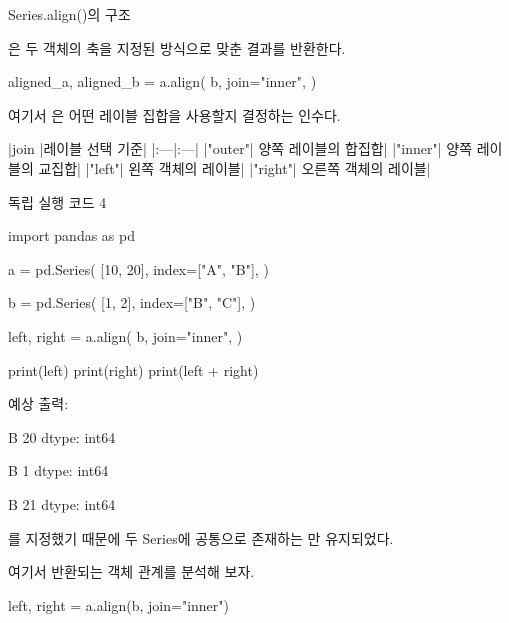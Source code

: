 \begin{dhknote}
\begin{dhksmry}[centered]
Series.align()의 구조
\end{dhksmry}
\end{dhknote}

은 두 객체의 축을 지정된 방식으로 맞춘 결과를 반환한다.

\begin{dhkcode}
aligned_a, aligned_b = a.align(
    b,
    join="inner",
)
\end{dhkcode}

여기서 은 어떤 레이블 집합을 사용할지 결정하는 인수다.

\begin{dhktable}
|join	|레이블 선택 기준|
|:---|:---|
|"outer"|	양쪽 레이블의 합집합|
|"inner"|	양쪽 레이블의 교집합|
|"left"|	왼쪽 객체의 레이블|
|"right"|	오른쪽 객체의 레이블|
\end{dhktable}

\begin{dhknote}
\begin{dhksmry}[centered]
독립 실행 코드 4
\end{dhksmry}
\end{dhknote}

\begin{dhkcode}
import pandas as pd

a = pd.Series(
    [10, 20],
    index=["A", "B"],
)

b = pd.Series(
    [1, 2],
    index=["B", "C"],
)

left, right = a.align(
    b,
    join="inner",
)

print(left)
print(right)
print(left + right)
\end{dhkcode}

예상 출력:

\begin{dhkzsh}
B    20
dtype: int64

B    1
dtype: int64

B    21
dtype: int64
\end{dhkzsh}

를 지정했기 때문에 두 Series에 공통으로 존재하는 만 유지되었다.

여기서 반환되는 객체 관계를 분석해 보자.

\begin{dhkcode}
left, right = a.align(b, join="inner")
\end{dhkcode}

